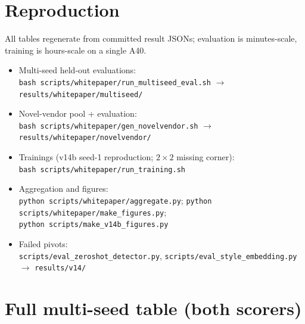 \documentclass[11pt]{article}
\newcommand{\vbest}{v14b}
\begin{document}
\section{Reproduction}
\label{app:repro}

All tables regenerate from committed result JSONs; evaluation is minutes-scale, training is
hours-scale on a single A40.

\begin{itemize}[leftmargin=2em]\small\raggedright
\item Multi-seed held-out evaluations:\\
      \texttt{bash scripts/whitepaper/run\_multiseed\_eval.sh}
      $\to$ \texttt{results/whitepaper/multiseed/}
\item Novel-vendor pool + evaluation:\\
      \texttt{bash scripts/whitepaper/gen\_novelvendor.sh}
      $\to$ \texttt{results/whitepaper/novelvendor/}
\item Trainings (\vbest{} seed-1 reproduction; $2{\times}2$ missing corner):\\
      \texttt{bash scripts/whitepaper/run\_training.sh}
\item Aggregation and figures:\\
      \texttt{python scripts/whitepaper/aggregate.py};\;
      \texttt{python scripts/whitepaper/make\_figures.py};\\
      \texttt{python scripts/make\_v14b\_figures.py}
\item Failed pivots:\\
      \texttt{scripts/eval\_zeroshot\_detector.py},
      \texttt{scripts/eval\_style\_embedding.py} $\to$ \texttt{results/v14/}
\end{itemize}

\section{Full multi-seed table (both scorers)}
\label{app:fulltable}
\end{document}
